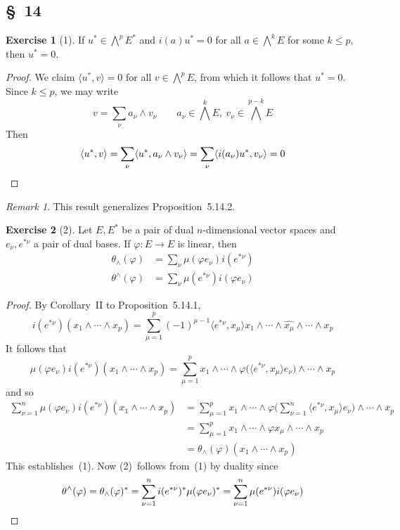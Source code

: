 \documentclass[letterpaper,12pt]{article}
\newcommand{\eprod}{\wedge}
\newcommand{\bigeprod}{\bigwedge}
\newcommand{\medeprod}{{\textstyle\bigeprod}}
\newcommand{\delete}{\widehat}
\newcommand{\sprod}[2]{\langle#1,#2\rangle}
\newcommand{\multi}[4]{#2_{#3}#1\cdots#1#2_{#4}}
\newcommand{\eprods}[3]{\multi{\eprod}{#1}{#2}{#3}}
\theoremstyle{definition}
\newtheorem*{exer}{Exercise}
\theoremstyle{remark}
\newtheorem*{rmk}{Remark}
\begin{document}
\subsection*{\S~14}
\begin{exer}[1]
If \(u^*\in\medeprod^p E^*\) and \(i(a)u^*=0\) for all \(a\in\medeprod^k E\) for some \(k\le p\), then \(u^*=0\).
\end{exer}
\begin{proof}
We claim \(\sprod{u^*}{v}=0\) for all \(v\in\medeprod^p E\), from which it follows that \(u^*=0\). Since \(k\le p\), we may write
\[v=\sum_{\nu}a_{\nu}\eprod v_{\nu}\qquad a_{\nu}\in\medeprod^k E,\ v_{\nu}\in\medeprod^{p-k}E\]
Then
\[\sprod{u^*}{v}=\sum_{\nu}\sprod{u^*}{a_{\nu}\eprod v_{\nu}}=\sum_{\nu}\sprod{i(a_{\nu})u^*}{v_{\nu}}=0\qedhere\]
\end{proof}
\begin{rmk}
This result generalizes Proposition~5.14.2.
\end{rmk}

\begin{exer}[2]
Let \(E,E^*\) be a pair of dual \(n\)-dimensional vector spaces and \(e_{\nu},e^{*\nu}\) a pair of dual bases. If \(\varphi:E\to E\) is linear, then
\begin{align*}
\theta_{\eprod}(\varphi)&=\sum_{\nu}\mu(\varphi e_{\nu})i(e^{*\nu})\tag{1}\\
\theta^{\eprod}(\varphi)&=\sum_{\nu}\mu(e^{*\nu})i(\varphi e_{\nu})\tag{2}
\end{align*}
\end{exer}
\begin{proof}
By Corollary~II to Proposition~5.14.1,
\[i(e^{*\nu})(\eprods{x}{1}{p})=\sum_{\mu=1}^p(-1)^{\mu-1}\sprod{e^{*\nu}}{x_{\mu}}x_1\eprod\cdots\eprod\delete{x_{\mu}}\eprod\cdots\eprod x_p\]
It follows that
\[\mu(\varphi e_{\nu})i(e^{*\nu})(\eprods{x}{1}{p})=\sum_{\mu=1}^p x_1\eprod\cdots\eprod\varphi\bigl(\sprod{e^{*\nu}}{x_{\mu}}e_{\nu}\bigr)\eprod\cdots\eprod x_p\]
and so
\begin{align*}
\sum_{\nu=1}^n\mu(\varphi e_{\nu})i(e^{*\nu})(\eprods{x}{1}{p})&=\sum_{\mu=1}^p x_1\eprod\cdots\eprod\varphi\bigl(\sum_{\nu=1}^n\sprod{e^{*\nu}}{x_{\mu}}e_{\nu}\bigr)\eprod\cdots\eprod x_p\\
	&=\sum_{\mu=1}^p x_1\eprod\cdots\eprod\varphi x_{\mu}\eprod\cdots\eprod x_p\\
	&=\theta_{\eprod}(\varphi)(\eprods{x}{1}{p})
\end{align*}
This establishes~(1). Now (2)~follows from~(1) by duality since
\[\theta^{\eprod}(\varphi)=\theta_{\eprod}(\varphi)^*=\sum_{\nu=1}^n i(e^{*\nu})^*\mu(\varphi e_{\nu})^*=\sum_{\nu=1}^n\mu(e^{*\nu})i(\varphi e_{\nu})\qedhere\]
\end{proof}
\end{document}
